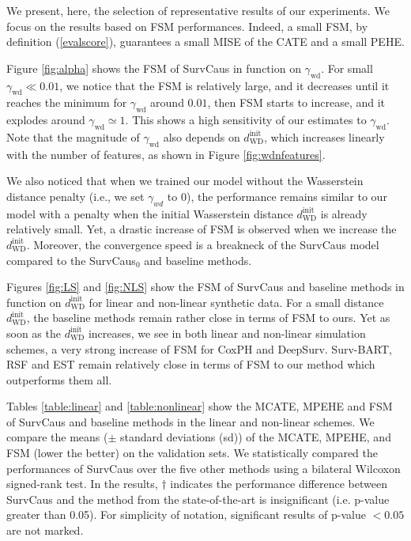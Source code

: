 \documentclass[12pt]{article}
\theoremstyle{plain}
\theoremstyle{definition}
\theoremstyle{remark}
\begin{document}
We present, here, the selection of representative results of our experiments. We focus on the results based on FSM performances. Indeed, a small FSM, by definition (\ref{evalscore}), guarantees a small MISE of the CATE and a small PEHE. 


Figure \ref{fig:alpha} shows the FSM of SurvCaus in function on $\gamma_{\text{wd}}$. For small $\gamma_{\text{wd}}\ll 0.01$, we notice that the FSM is relatively large, and it decreases until it reaches the minimum for $\gamma_{\text{wd}}$ around $0.01$, then FSM starts to increase, and it explodes around $\gamma_{\text{wd}}\simeq 1$. This shows a high sensitivity of our estimates to $\gamma_{\text{wd}}$. Note that the magnitude of $\gamma_{\text{wd}}$ also depends on $d_{\text{WD}}^{\text{init}}$, which increases linearly with the number of features, as shown in Figure \ref{fig:wdnfeatures}. 

We also noticed that when we trained our model without the Wasserstein distance penalty (i.e., we set $\gamma_{wd}$ to 0), the performance remains similar to our model with a penalty when the initial Wasserstein distance $d_{\text{WD}}^{\text{init}}$ is already relatively small. Yet, a drastic increase of FSM is observed when we increase the $d_{\text{WD}}^{\text{init}}$. Moreover, the convergence speed is a breakneck of the SurvCaus model compared to the SurvCaus$_0$ and baseline methods.

Figures \ref{fig:LS} and \ref{fig:NLS} show the FSM of SurvCaus and baseline methods in function on $d_{\text{WD}}^{\text{init}}$ for linear and non-linear synthetic data. For a small distance $d_{\text{WD}}^{\text{init}}$, the baseline methods remain rather close in terms of FSM to ours.  Yet as soon as the $d_{\text{WD}}^{\text{init}}$ increases, we see in both linear and non-linear simulation schemes, a very strong increase of FSM for CoxPH and DeepSurv.  Surv-BART, RSF and EST remain relatively close in terms of FSM to our method which outperforms them all.


Tables \ref{table:linear} and \ref{table:nonlinear} show the MCATE, MPEHE and FSM of SurvCaus and baseline methods in the linear and non-linear schemes. 
We compare the means ($\pm$ standard deviations (sd)) of the MCATE, MPEHE, and FSM (lower the better) on the validation sets. We statistically compared the performances of SurvCaus over the five other methods using a bilateral Wilcoxon \cite{Wilcoxon1945IndividualCB} signed-rank test. In the results, $\dagger$ indicates the performance difference between SurvCaus and the method from the state-of-the-art is insignificant (i.e. p-value greater than 0.05). For simplicity of notation, significant results of p-value $< 0.05$ are not marked.
\end{document}
